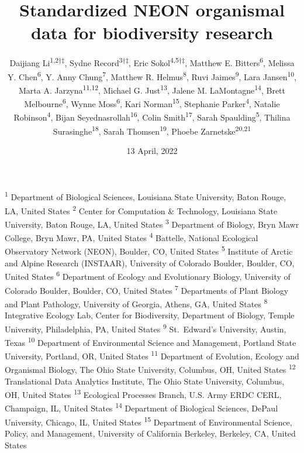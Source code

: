 \documentclass[
  12pt,
]{article}
\title{Standardized NEON organismal data for biodiversity research}
\author{Daijiang Li\textsuperscript{1,2†‡}, Sydne Record\textsuperscript{3†‡}, Eric Sokol\textsuperscript{4,5†‡}, Matthew E. Bitters\textsuperscript{6}, Melissa Y. Chen\textsuperscript{6}, Y. Anny Chung\textsuperscript{7}, Matthew R. Helmus\textsuperscript{8}, Ruvi Jaimes\textsuperscript{9}, Lara Jansen\textsuperscript{10}, Marta A. Jarzyna\textsuperscript{11,12}, Michael G. Just\textsuperscript{13}, Jalene M. LaMontagne\textsuperscript{14}, Brett Melbourne\textsuperscript{6}, Wynne Moss\textsuperscript{6}, Kari Norman\textsuperscript{15}, Stephanie Parker\textsuperscript{4}, Natalie Robinson\textsuperscript{4}, Bijan Seyednasrollah\textsuperscript{16}, Colin Smith\textsuperscript{17}, Sarah Spaulding\textsuperscript{5}, Thilina Surasinghe\textsuperscript{18}, Sarah Thomsen\textsuperscript{19}, Phoebe Zarnetske\textsuperscript{20,21}}
\date{13 April, 2022}
\makeatletter
\newcommand\iraggedright{%
  \let\\\@centercr\@rightskip\@flushglue \rightskip\@rightskip
  \leftskip\z@skip}
\makeatother
\begin{document}
\maketitle

\iraggedright

\footnotesize

\textsuperscript{1} Department of Biological Sciences, Louisiana State University, Baton Rouge, LA, United States\\
\textsuperscript{2} Center for Computation \& Technology, Louisiana State University, Baton Rouge, LA, United States\\
\textsuperscript{3} Department of Biology, Bryn Mawr College, Bryn Mawr, PA, United States\\
\textsuperscript{4} Battelle, National Ecological Observatory Network (NEON), Boulder, CO, United States\\
\textsuperscript{5} Institute of Arctic and Alpine Research (INSTAAR), University of Colorado Boulder, Boulder, CO, United States\\
\textsuperscript{6} Department of Ecology and Evolutionary Biology, University of Colorado Boulder, Boulder, CO, United States\\
\textsuperscript{7} Departments of Plant Biology and Plant Pathology, University of Georgia, Athens, GA, United States\\
\textsuperscript{8} Integrative Ecology Lab, Center for Biodiversity, Department of Biology, Temple University, Philadelphia, PA, United States\\
\textsuperscript{9} St.~Edward's University, Austin, Texas\\
\textsuperscript{10} Department of Environmental Science and Management, Portland State University, Portland, OR, United States\\
\textsuperscript{11} Department of Evolution, Ecology and Organismal Biology, The Ohio State University, Columbus, OH, United States\\
\textsuperscript{12} Translational Data Analytics Institute, The Ohio State University, Columbus, OH, United States\\
\textsuperscript{13} Ecological Processes Branch, U.S. Army ERDC CERL, Champaign, IL, United States\\
\textsuperscript{14} Department of Biological Sciences, DePaul University, Chicago, IL, United States\\
\textsuperscript{15} Department of Environmental Science, Policy, and Management, University of California Berkeley, Berkeley, CA, United States\\
\end{document}
